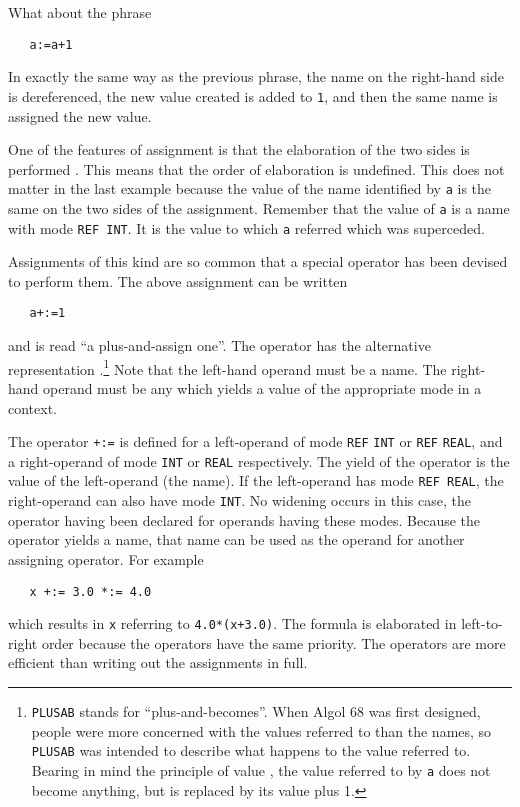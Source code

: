 What about the phrase
\begin{verbatim}
   a:=a+1
\end{verbatim}
\noindent
In exactly the same way as the previous phrase, the name on the
right-hand side is dereferenced, the new value created is added to
\verb|1|, and then the same name is assigned the new value.

One of the features of assignment is that the elaboration of the two
sides is performed . This
means that the order of elaboration is undefined.  This does not matter
in the last example because the value of the name identified by
\verb|a| is the same on the two sides of the assignment. Remember that
the value of \verb|a| is a name with mode \verb|REF INT|.  It is the
value to which \verb|a| referred which was superceded.

Assignments of this kind are so common that a special operator has been
devised to perform them. The above assignment can be
written
\begin{verbatim}
   a+:=1
\end{verbatim}
\noindent
and is read ``a plus-and-assign one''. The operator has the
alternative representation .\footnote{\texttt{PLUSAB}
stands for ``plus-and-becomes''. When Algol 68 was first designed,
people were more concerned with the values referred to than the
names, so \texttt{PLUSAB} was intended to describe what happens to
the value referred to. Bearing in mind the principle of value
\protect{}, the value
referred to by \texttt{a} does not become anything, but is replaced by
its value plus 1.} Note that the left-hand operand must be a name.
The right-hand operand must be any  which yields a value of
the appropriate mode in a  context.

The operator \verb|+:=| is defined for a left-operand of mode
\verb|REF| \verb|INT| or \verb|REF| \verb|REAL|, and a right-operand
of mode \verb|INT| or \verb|REAL| respectively.  The yield of the
operator is the value of the left-operand (the name).  If the
left-operand has mode \verb|REF REAL|, the right-operand can also
have mode \verb|INT|.  No widening occurs in this case, the operator
having been declared for operands having these modes. Because the
operator yields a name, that name can be used as the operand for
another assigning operator. For example
\begin{verbatim}
   x +:= 3.0 *:= 4.0
\end{verbatim}
\noindent
which results in \verb|x| referring to \verb|4.0*(x+3.0)|. The formula
is elaborated in left-to-right order because the operators have the
same priority. The operators are more efficient than writing out the
assignments in full.


